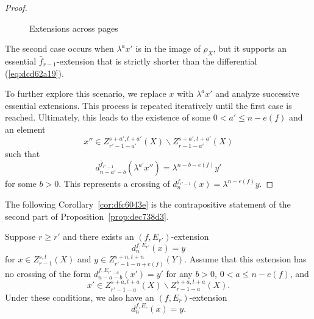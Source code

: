 \documentclass{amsart}
\numberwithin{equation}{section}
\newcommand{\drawarrow}{\draw[-{Stealth[length=1.5mm]}, shorten >=(0.08cm)]}
\begin{document}
\begin{proof}
\begin{figure}[h]
{}
    \caption{Extensions across pages}\label{fig:b22d961f}
    \end{figure}
    
    The second case occurs when $\lambda^ax'$ is in the image of $\rho_X$, but it supports an essential $\hat f_{r-1}$-extension that is strictly shorter than the differential (\ref{eq:dcd62a19}). 
    
    To further explore this scenario, we replace $x$ with $\lambda^ax'$ and analyze successive essential extensions. This process is repeated iteratively until the first case is reached. Ultimately, this leads to the existence of some $0<a'\le n-e(f)$ and an element
    $$x''\in Z_{r'-1-a'}^{s+a',t+a'}(X)\backslash Z_{r-1-a'}^{s+a',t+a'}(X)$$
    such that
    $$d^{\hat f_{r'-1}}_{n-a'-b}(\lambda^{a'} x'')=\lambda^{n-b-e(f)} y'$$
    for some $b>0$. This represents a crossing of $d^{\hat f_{r'-1}}_n(x)=\lambda^{n-e(f)}y$.
    
\end{proof}


The following Corollary~\ref{cor:dfc6043e} is the contrapositive statement of the second part of Proposition~\ref{prop:dec738d3}.


\begin{corollary}\label{cor:dfc6043e}
    Suppose $r\ge r'$ and there exists an $(f,E_{r'})$-extension 
    $$d^{f,E_{r'}}_n(x)=y$$
    for $x\in Z_{r-1}^{s,t}(X)$ and $y\in Z_{r'-1-n+e(f)}^{s+n,t+n}(Y)$. Assume that this extension has no crossing of the form $d^{f,E_{r'-a}}_{n-a-b}(x')=y'$ for any $b>0$, $0<a\le n-e(f)$, and 
    $$x'\in Z_{r'-1-a}^{s+a,t+a}(X)\backslash Z_{r-1-a}^{s+a,t+a}(X).$$ 
    Under these conditions, we also have an $(f,E_{r})$-extension
    $$d^{f,E_{r}}_n(x)=y.$$
\end{corollary}
\end{document}
